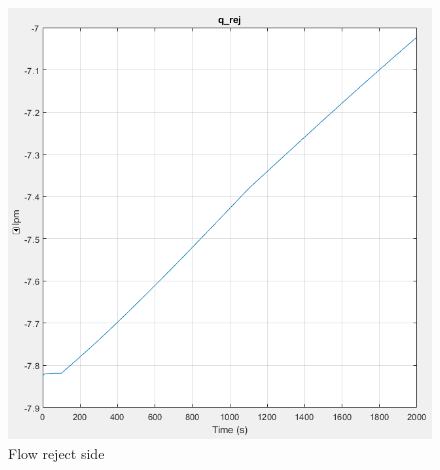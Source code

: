 \begin{figure}[h]
  \centering
  \includegraphics[width=0.5\linewidth]{q_rej.PNG}
  \caption{Flow reject side}
  \label{fig:qrej}
\end{figure}
